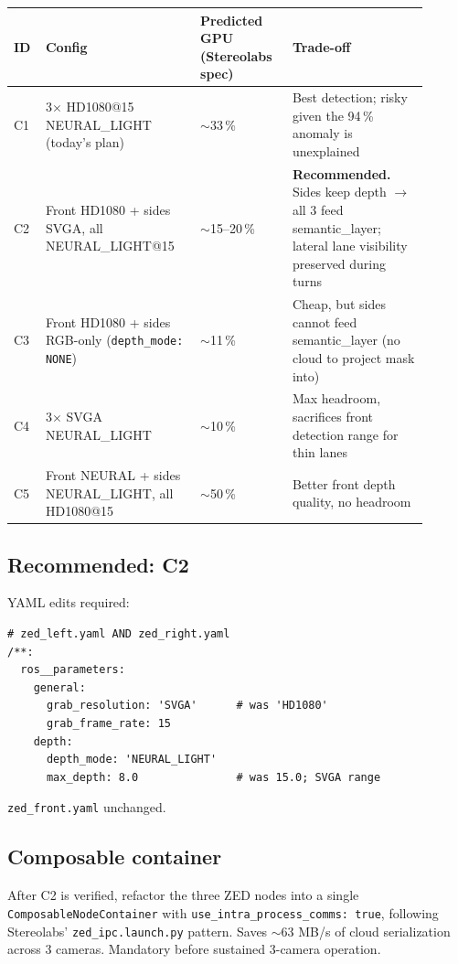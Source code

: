 \documentclass[11pt]{article}
\begin{document}
\begin{longtable}{p{0.06\linewidth} p{0.34\linewidth} p{0.20\linewidth} p{0.30\linewidth}}
\toprule
\textbf{ID} & \textbf{Config} & \textbf{Predicted GPU (Stereolabs spec)} & \textbf{Trade-off} \\
\midrule
C1 & 3$\times$ HD1080@15 NEURAL\_LIGHT (today's plan) & $\sim$33\,\% & Best detection; risky given the 94\,\% anomaly is unexplained \\
C2 & Front HD1080 + sides SVGA, all NEURAL\_LIGHT@15 & $\sim$15--20\,\% & \textbf{Recommended.} Sides keep depth $\to$ all 3 feed semantic\_layer; lateral lane visibility preserved during turns \\
C3 & Front HD1080 + sides RGB-only (\texttt{depth\_mode: NONE}) & $\sim$11\,\% & Cheap, but sides cannot feed semantic\_layer (no cloud to project mask into) \\
C4 & 3$\times$ SVGA NEURAL\_LIGHT & $\sim$10\,\% & Max headroom, sacrifices front detection range for thin lanes \\
C5 & Front NEURAL + sides NEURAL\_LIGHT, all HD1080@15 & $\sim$50\,\% & Better front depth quality, no headroom \\
\bottomrule
\end{longtable}

\subsection{Recommended: C2}

YAML edits required:

\begin{lstlisting}
# zed_left.yaml AND zed_right.yaml
/**:
  ros__parameters:
    general:
      grab_resolution: 'SVGA'      # was 'HD1080'
      grab_frame_rate: 15
    depth:
      depth_mode: 'NEURAL_LIGHT'
      max_depth: 8.0               # was 15.0; SVGA range
\end{lstlisting}

\texttt{zed\_front.yaml} unchanged.

\subsection{Composable container}

After C2 is verified, refactor the three ZED nodes into a single
\texttt{ComposableNodeContainer} with \texttt{use\_intra\_process\_comms:
true}, following Stereolabs' \texttt{zed\_ipc.launch.py} pattern. Saves
$\sim$63 MB/s of cloud serialization across 3 cameras. Mandatory before
sustained 3-camera operation.
\end{document}
